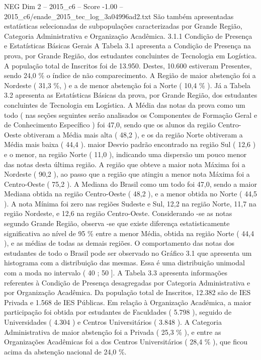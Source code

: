 \begin{textsample}{NEG Dim 2 – 2015\_c6 – Score -1.00 – 2015\_c6/enade\_2015\_tec\_log\_3a04996ad2.txt}
São também apresentadas estatísticas selecionadas de subpopulações caracterizadas por Grande Região, Categoria Administrativa e Organização Acadêmica. 3.1.1 Condição de Presença e Estatísticas Básicas Gerais A Tabela 3.1 apresenta a Condição de Presença na prova, por Grande Região, dos estudantes concluintes de Tecnologia em Logística.
A população total de Inscritos foi de 13.950.
Destes, 10.600 estiveram Presentes, sendo 24,0 \% o índice de não comparecimento.
A Região de maior abstenção foi a Nordeste ( 31,3 \%, ) e a de menor abstenção foi a Norte ( 10,4 \% ).
Já a Tabela 3.2 apresenta as Estatísticas Básicas da prova, por Grande Região, dos estudantes concluintes de Tecnologia em Logística.
A Média das notas da prova como um todo ( nas seções seguintes serão analisados os Componentes de Formação Geral e de Conhecimento Específico ) foi 47,0, sendo que os alunos da região Centro-Oeste obtiveram a Média mais alta ( 48,2 ), e os da região Norte obtiveram a Média mais baixa ( 44,4 ). maior Desvio padrão encontrado na região Sul ( 12,6 ) e o menor, na região Norte ( 11,0 ), indicando uma dispersão um pouco menor das notas desta última região.
A região que obteve a maior nota Máxima foi a Nordeste ( 90,2 ), ao passo que a região que atingiu a menor nota Máxima foi a Centro-Oeste ( 75,2 ).
A Mediana do Brasil como um todo foi 47,0, sendo a maior Mediana obtida na região Centro-Oeste ( 48,2 ), e a menor obtida no Norte ( 44,5 ).
A nota Mínima foi zero nas regiões Sudeste e Sul, 12,2 na região Norte, 11,7 na região Nordeste, e 12,6 na região Centro-Oeste.
Considerando -se as notas segundo Grande Região, observa -se que existe diferença estatisticamente significativa ao nível de 95 \% entre a menor Média, obtida na região Norte ( 44,4 ), e as médias de todas as demais regiões.
O comportamento das notas dos estudantes de todo o Brasil pode ser observado no Gráfico 3.1 que apresenta um histograma com a distribuição das mesmas.
Essa é uma distribuição unimodal com a moda no intervalo ( 40 ; 50 ].
A Tabela 3.3 apresenta informações referentes à Condição de Presença desagregadas por Categoria Administrativa e por Organização Acadêmica.
Da população total de Inscritos, 12.382 são de IES Privada e 1.568 de IES Públicas.
Em relação à Organização Acadêmica, a maior participação foi obtida por estudantes de Faculdades ( 5.798 ), seguido de Universidades ( 4.304 ) e Centros Universitários ( 3.848 ).
A Categoria Administrativa de maior abstenção foi a Privada ( 25,3 \% ), e entre as Organizações Acadêmicas foi a dos Centros Universitários ( 28,4 \% ), que ficou acima da abstenção nacional de 24,0 \%.

\end{textsample}
